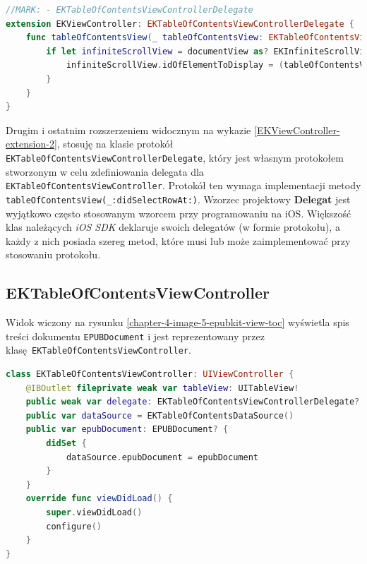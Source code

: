 \begin{lstlisting}[language=swift,caption={Rozszerzenie klasy texttt{EKViewController} o protokół texttt{EKTableOfContentsViewControllerDelegate}},label=EKViewController-extension-2]
//MARK: - EKTableOfContentsViewControllerDelegate
extension EKViewController: EKTableOfContentsViewControllerDelegate {
    func tableOfContentsView(_ tableOfContentsView: EKTableOfContentsViewController, didSelectRowAt indexPath: IndexPath) {
        if let infiniteScrollView = documentView as? EKInfiniteScrollView {
            infiniteScrollView.idOfElementToDisplay = (tableOfContentsView.dataSource.item(at: indexPath) as? EKTableOfContentsDataSource.Item)?.item
        }
    }
}
\end{lstlisting}

Drugim i ostatnim rozszerzeniem widocznym na wykazie \ref{EKViewController-extension-2}, stosuję na klasie protokół \texttt{EKTableOfContentsViewControllerDelegate}, który jest własnym protokołem stworzonym w celu zdefiniowania delegata dla \texttt{EKTableOfContentsViewController}. Protokół ten wymaga implementacji metody \texttt{tableOfContentsView(\_:didSelectRowAt:)}. Wzorzec projektowy \textbf{Delegat} jest wyjątkowo często stosowanym wzorcem przy programowaniu na iOS. Większość klas należących \textit{iOS SDK} deklaruje swoich delegatów (w formie protokołu), a każdy z nich posiada szereg metod, które musi lub może zaimplementować przy stosowaniu protokołu.

\subsection{EKTableOfContentsViewController}

Widok wiczony na rysunku \ref{chapter-4-image-5-epubkit-view-toc} wyświetla spis treści dokumentu \texttt{EPUBDocument} i jest reprezentowany przez klasę \texttt{EKTableOfContentsViewController}.

\begin{lstlisting}[language=swift,caption={Deklaracja klasy \texttt{EKTableOfContentsViewController}},label=EKTableOfContentsViewController-declaration]
class EKTableOfContentsViewController: UIViewController {
    @IBOutlet fileprivate weak var tableView: UITableView!
    public weak var delegate: EKTableOfContentsViewControllerDelegate?
    public var dataSource = EKTableOfContentsDataSource()
    public var epubDocument: EPUBDocument? {
        didSet {
            dataSource.epubDocument = epubDocument
        }
    }
    override func viewDidLoad() {
        super.viewDidLoad()
        configure()
    }
}
\end{lstlisting}

